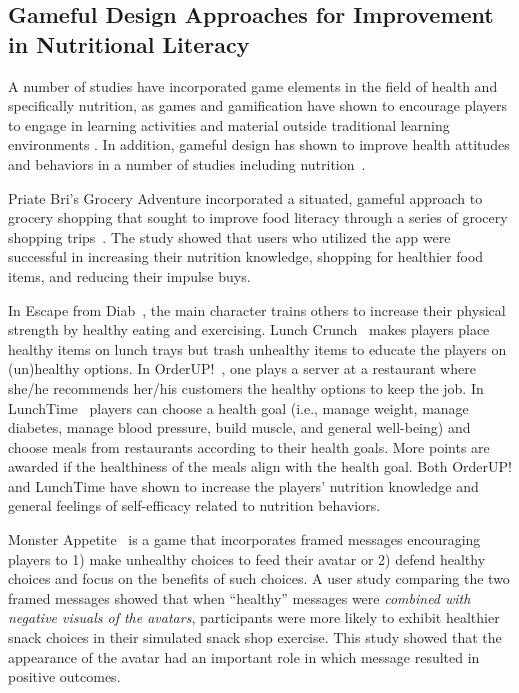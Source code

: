 \vspace{-5pt}
\subsection{Gameful Design Approaches for Improvement in Nutritional Literacy}
A number of studies have incorporated game elements in the field of health and specifically nutrition, as games and  gamification have shown to encourage players to engage in learning activities and material outside traditional learning environments \cite{alessi1991computer, blumberg2014serious,chen2014healthifying,huizenga2009mobile,jui2011game,mueller2011designing,papastergiou2009exploring,richards2014beyond}. In addition, gameful design has shown to improve health attitudes and behaviors in a number of studies including nutrition~\cite{deterding2011game,grimes2010let, johnson2016gamification,kyfonidis2019making,peng2009design,orji2013lunchtime,orji2017improving}.

Priate Bri's Grocery Adventure incorporated a situated, gameful approach to grocery shopping that sought to improve food literacy through a series of grocery shopping trips~\cite{bomfim2018pirate,bomfim2020food}. The study showed that users who utilized the app were successful in increasing their nutrition knowledge, shopping for healthier food items, and reducing their impulse buys. 

In Escape from Diab~\cite{thompson2008serious}, the main character trains others to increase their physical strength by healthy eating and exercising. Lunch Crunch~\cite{lunchcrunch} makes players place healthy items on lunch trays but trash unhealthy items to educate the players on (un)healthy options. In OrderUP!~\cite{grimes2010let}, one plays a server at a restaurant where she/he recommends her/his customers the healthy options to keep the job. In LunchTime~\cite{orji2013lunchtime} players can choose a health goal (i.e., manage weight, manage diabetes, manage blood pressure, build muscle, and general well-being) and choose meals from restaurants according to their health goals. More points are awarded if the healthiness of the meals align with the health goal. Both OrderUP! and LunchTime have shown to increase the players' nutrition knowledge and general feelings of self-efficacy related to nutrition behaviors. 

Monster Appetite~\cite{hwang2017monster} is a game that incorporates framed messages encouraging players to 1) make unhealthy choices to feed their avatar or 2) defend healthy choices and focus on the benefits of such choices. A user study comparing the two framed messages showed that when ``healthy'' messages were \textit{combined with negative visuals of the avatars}, participants were more likely to exhibit healthier snack choices in their simulated snack shop exercise. This study showed that the appearance of the avatar had an important role in which message resulted in positive outcomes.



